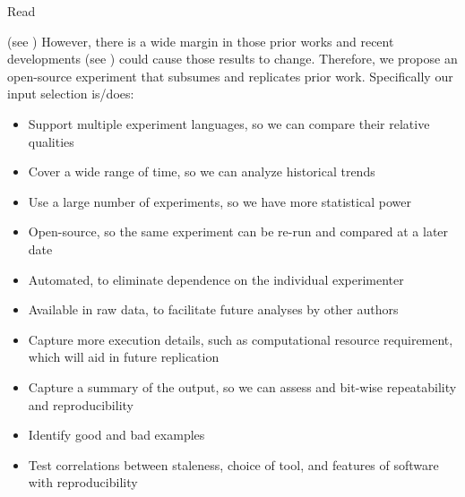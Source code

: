 Read \cite{elsner_empirically_2021}


(see )
However, there is a wide margin in those prior works and recent developments (see ) could cause those results to change.
Therefore, we propose an open-source experiment that subsumes and replicates prior work.
Specifically our input selection is/does:
\begin{itemize}
 \item Support multiple experiment languages, so we can compare their relative qualities
 \item Cover a wide range of time, so we can analyze historical trends
 \item Use a large number of experiments, so we have more statistical power
 \item Open-source, so the same experiment can be re-run and compared at a later date
 \item Automated, to eliminate dependence on the individual experimenter
 \item Available in raw data, to facilitate future analyses by other authors
 \item Capture more execution details, such as computational resource requirement, which will aid in future replication
 \item Capture a summary of the output, so we can assess and bit-wise repeatability and reproducibility
 \item Identify good and bad examples
 \item Test correlations between staleness, choice of tool, and features of software with reproducibility
\end{itemize}

